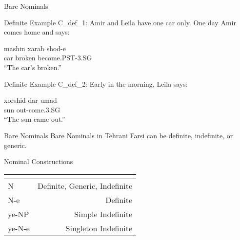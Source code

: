 \documentclass[10pt]{beamer}
\begin{document}
\begin {frame} {Bare Nominals}

\begin {exampleblock} {Definite Example}
{\small C_{def_1}: Amir and Leila have one car only. One day Amir comes home and says:}
	\begin {exe}
		\ex \label{} \gll	m\={a}shin	xar\={a}b	shod-e\\
			car	broken	become{\scriptsize .PST-3.SG}\\
			``The car's broken.''\\
	\end {exe}
\end {exampleblock}
\pause
    \begin {exampleblock} {Definite Example}
{\small C_{def_2}: Early in the morning, Leila says:}
    	\begin {exe}
    		\ex \label{} \gll	xorshid	dar-umad\\
    			sun	out-come{\scriptsize .3.SG}\\
    			``The sun came out.''\\
    	\end {exe}
    \end {exampleblock}
\end {frame}

\begin {frame} {Bare Nominals}
Bare Nominals in Tehrani Farsi can be definite, indefinite, or generic.
\end {frame}

\begin {frame} {Nominal Constructions}

\begin {tabular}{l | r}
\multicolumn{2}{c}{} \\\hline
\hspace{0.44cm}N & Definite, Generic, Indefinite\\ \hline
\alert{\hspace{0.44cm}N-{\color {red}e}} & \alert{Definite} \\ \hline
{\color {ggreen}ye}-NP & Simple Indefinite\\ \hline
{\color {ggreen}ye}-N-{\color {red}e} & Singleton Indefinite\\ \hline
\end {tabular}

\end {frame}
\end{document}
